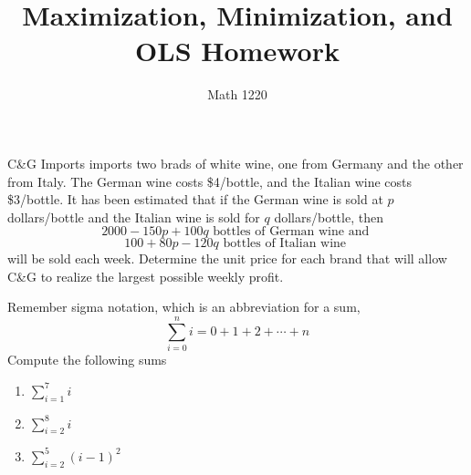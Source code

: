 \documentclass[12pt, a4paper]{article}
\author{Math 1220}
\title{Maximization, Minimization, and OLS Homework}
\date{}
\begin{document}
\maketitle
\nameline
\begin{ex}
  C\&G Imports imports two brads of white wine, one from Germany and
  the other from Italy. The German wine costs \$4/bottle, and the
  Italian wine costs \$3/bottle. It has been estimated that if the
  German wine is sold at \(p\) dollars/bottle and the Italian wine is
  sold for \(q\) dollars/bottle, then \[
    2000-150p+100q \text{ bottles of German wine and } 
  \]
  \[
    100+80p-120q \text{ bottles of Italian wine }
  \]
  will be sold each week. Determine the unit price for each brand that
  will allow C\&G to realize the largest possible weekly profit.
\end{ex}
\begin{ex}
  Remember sigma notation, which is an abbreviation for a sum, \[
    \sum_{i=0}^n i = 0+1+2+ \cdots + n
  \]
  Compute the following sums
  \begin{enumerate}
  \item \(\sum_{i=1}^7 i\)
  \item \(\sum_{i=2}^8 i\)
  \item \(\sum_{i=2}^5 (i-1)^2\)
  \end{enumerate}
\end{ex}
\vspace{-2in}
\end{document}
